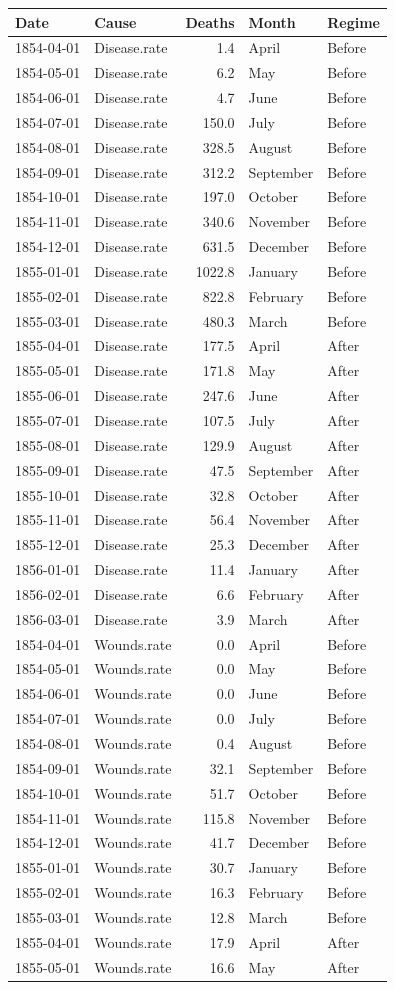 \documentclass[
]{article}
\begin{document}
\begin{longtable}[]{@{}llrll@{}}
\toprule
Date & Cause & Deaths & Month & Regime\tabularnewline
\midrule
\endhead
1854-04-01 & Disease.rate & 1.4 & April & Before\tabularnewline
1854-05-01 & Disease.rate & 6.2 & May & Before\tabularnewline
1854-06-01 & Disease.rate & 4.7 & June & Before\tabularnewline
1854-07-01 & Disease.rate & 150.0 & July & Before\tabularnewline
1854-08-01 & Disease.rate & 328.5 & August & Before\tabularnewline
1854-09-01 & Disease.rate & 312.2 & September & Before\tabularnewline
1854-10-01 & Disease.rate & 197.0 & October & Before\tabularnewline
1854-11-01 & Disease.rate & 340.6 & November & Before\tabularnewline
1854-12-01 & Disease.rate & 631.5 & December & Before\tabularnewline
1855-01-01 & Disease.rate & 1022.8 & January & Before\tabularnewline
1855-02-01 & Disease.rate & 822.8 & February & Before\tabularnewline
1855-03-01 & Disease.rate & 480.3 & March & Before\tabularnewline
1855-04-01 & Disease.rate & 177.5 & April & After\tabularnewline
1855-05-01 & Disease.rate & 171.8 & May & After\tabularnewline
1855-06-01 & Disease.rate & 247.6 & June & After\tabularnewline
1855-07-01 & Disease.rate & 107.5 & July & After\tabularnewline
1855-08-01 & Disease.rate & 129.9 & August & After\tabularnewline
1855-09-01 & Disease.rate & 47.5 & September & After\tabularnewline
1855-10-01 & Disease.rate & 32.8 & October & After\tabularnewline
1855-11-01 & Disease.rate & 56.4 & November & After\tabularnewline
1855-12-01 & Disease.rate & 25.3 & December & After\tabularnewline
1856-01-01 & Disease.rate & 11.4 & January & After\tabularnewline
1856-02-01 & Disease.rate & 6.6 & February & After\tabularnewline
1856-03-01 & Disease.rate & 3.9 & March & After\tabularnewline
1854-04-01 & Wounds.rate & 0.0 & April & Before\tabularnewline
1854-05-01 & Wounds.rate & 0.0 & May & Before\tabularnewline
1854-06-01 & Wounds.rate & 0.0 & June & Before\tabularnewline
1854-07-01 & Wounds.rate & 0.0 & July & Before\tabularnewline
1854-08-01 & Wounds.rate & 0.4 & August & Before\tabularnewline
1854-09-01 & Wounds.rate & 32.1 & September & Before\tabularnewline
1854-10-01 & Wounds.rate & 51.7 & October & Before\tabularnewline
1854-11-01 & Wounds.rate & 115.8 & November & Before\tabularnewline
1854-12-01 & Wounds.rate & 41.7 & December & Before\tabularnewline
1855-01-01 & Wounds.rate & 30.7 & January & Before\tabularnewline
1855-02-01 & Wounds.rate & 16.3 & February & Before\tabularnewline
1855-03-01 & Wounds.rate & 12.8 & March & Before\tabularnewline
1855-04-01 & Wounds.rate & 17.9 & April & After\tabularnewline
1855-05-01 & Wounds.rate & 16.6 & May & After\tabularnewline

\end{longtable}
\end{document}

